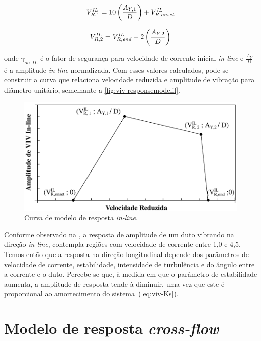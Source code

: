 \begin{equation}
V_{R, 1}^\mathit{IL} = 10 \left(\frac{A_{Y, 1}}{D}\right)+ V_{R,\mathit{onset}}^\mathit{IL}\\
\end{equation}

\begin{equation}
V_{R, 2}^\mathit{IL} =  V_{R, \mathit{end}}^\mathit{IL} - 2 \left(\frac{A_{Y, 2}}{D}\right)\\
\end{equation}

onde $\gamma_{\mathit{on}, \mathit{IL}}$ é o fator de segurança para velocidade de corrente inicial \textit{in-line} e $\frac{A_Y}{D}$ é a amplitude \textit{in-line} normalizada. Com esses valores calculados, pode-se construir a curva que relaciona velocidade reduzida e amplitude de vibração para diâmetro unitário, semelhante a \autoref{fig:viv-responsemodelil}.

\begin{figure}[!ht]
    \centering
    \caption{Curva de modelo de resposta \textit{in-line}.}\label{fig:viv-responsemodelil}
    \includegraphics[width=0.8\linewidth]{imagens/response_model_IL}
\end{figure}

Conforme observado na , a resposta de amplitude de um duto vibrando na direção \textit{in-line}, contempla regiões com velocidade de corrente entre 1,0 e 4,5.
Temos então que a resposta na direção longitudinal depende dos parâmetros de velocidade de corrente, estabilidade, intensidade de turbulência e do ângulo entre a corrente e o duto.
Percebe-se que, à medida em que o parâmetro de estabilidade aumenta, a amplitude de resposta tende à diminuir, uma vez que este é proporcional ao amortecimento do sistema~(\autoref{eq:viv-Ks}).


\section{Modelo de resposta \textit{cross-flow}}

